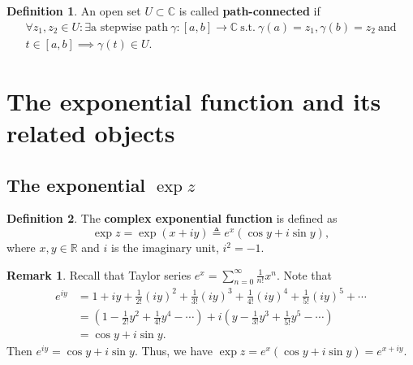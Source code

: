 \documentclass[12pt,openany]{book}
\theoremstyle{definition}
\newtheorem{definition}{Definition}[chapter]
\newtheorem{remark}{Remark}[section]
\newcommand{\R}{\mathbb{R}}
\newcommand{\C}{\mathbb{C}}
\newcommand{\of}[1]{\left( #1 \right)}
\begin{document}
	\begin{tcolorbox}[title=Path-connected;]
		\begin{definition}
			An open set $U\subset\C$ is called \textbf{path-connected} if \begin{align*}
				\forall z_1,z_2\in U:\exists\text{a stepwise path}\ \gamma:[a,b]\to\C\ \text{s.t.}\ \gamma(a)=z_1,\gamma(b)=z_2\ \text{and}\\
				t\in[a,b]\implies\gamma(t)\in U.
			\end{align*}
		\end{definition}
	\end{tcolorbox}
	
	\newpage
	\section{The exponential function and its related objects}
	
	\subsection{The exponential $\exp z$}
	\begin{tcolorbox}[colback=white,colframe=defcolor,arc=5pt,title={\color{white}\bf Complex Exponential}]
		\begin{definition}
			The \textbf{complex exponential function} is defined as
			\begin{equation*}
				\exp{z} =\exp{(x+iy)} \triangleq e^{x}(\cos y + i\sin y),
			\end{equation*}
			where $x,y\in\R$ and $i$ is the imaginary unit, $i^2=-1$.
		\end{definition}
	\end{tcolorbox}
	\begin{remark}
		Recall that Taylor series $e^x=\sum_{n=0}^\infty\frac{1}{n!}x^n$. Note that \begin{align*}
			e^{iy}&=1+iy+\frac{1}{2!}(iy)^2+\frac{1}{3!}(iy)^3+\frac{1}{4!}(iy)^4+\frac{1}{5!}(iy)^5+\cdots\\
			&=\of{1-\frac{1}{2!}y^2+\frac{1}{4!}y^4-\cdots}+i\of{y-\frac{1}{3!}y^3+\frac{1}{5!}y^5-\cdots}\\
			&=\cos y+i\sin y.
		\end{align*} Then $e^{iy}=\cos y+i\sin y$. Thus, we have $
		\exp z=e^x(\cos y+i\sin y)=e^{x+iy}.
		$
	\end{remark}
	
\end{document}
